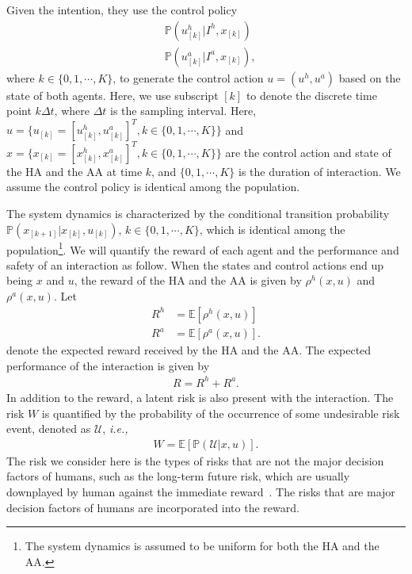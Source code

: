 \documentclass[letterpaper]{article} %
\newcommand{\ie}{\textit{i.e., }}
\begin{document}
Given the intention, they use the control policy
\begin{align}
 &\mathbb{P}(u^h_{[k]}| I^h,x_{[k]}) \\
 &\mathbb{P}(u^a_{[k]}|I^a,x_{[k]}),
\end{align}
where $k \in \{0,1,\cdots,K\}$, to generate the control action $u = (u^h, u^a)$ based on the state of both agents.
Here, we use subscript $[k]$ to denote the discrete time point $k\Delta t$, where $\Delta t$ is the sampling interval. Here, $ u = \{ u_{[k]} = [u_{[k]}^{h} ,u_{[k]}^{a}]^T , k \in \{0,1,\cdots,K\} \} $ and $x = \{ x_{[k]} = [x_{[k]}^{h} ,x_{[k]}^{a}]^T , k \in \{0,1,\cdots,K\} \}$ are the control action and state of the HA and the AA at time $k$, and $\{0,1,\cdots,K\}$ is the duration of interaction. We assume the control policy is identical among the population.

The system dynamics is characterized by the conditional transition probability $\mathbb{P}(x_{[k+1]}|x_{[k]},u_{[k]})$, $k \in \{0,1,\cdots,K\}$, which is identical among the population\footnote{The system dynamics is assumed to be uniform for both the HA and the AA.}. We will quantify the reward of each agent and the performance and safety of an interaction as follow. When the states and control actions end up being $x$ and $u$, the reward of the HA and the AA is given by $\rho^h(x,u)$ and $\rho^a(x,u)$. Let
\begin{align}
    R^h&=\mathbb{E}[\rho^h(x,u)]\\
    R^a&=\mathbb{E}[\rho^a(x,u)].
\end{align}
denote the expected reward received by the HA and the AA. The expected performance of the interaction is given by
\begin{align}
    R=R^h+R^a.
\end{align}
In addition to the reward, a latent risk is also present with the interaction.
The risk $W$ is quantified by the probability of the occurrence of some undesirable risk event, denoted as $\mathcal{U}$, \ie
\begin{align}
    W=\mathbb{E}[\mathbb{P}(\mathcal{U}|x,u)].
\end{align}
The risk we consider here is the types of risks that are not the major decision factors of humans, such as the long-term future risk, which are usually downplayed by human against the immediate reward~\cite{shirado2020collective}. The risks that are major decision factors of humans are incorporated into the reward.
\end{document}
